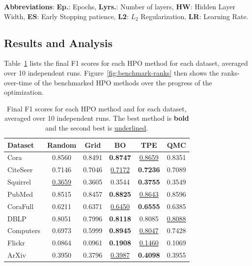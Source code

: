 \begin{table}
	{\footnotesize  \textbf{Abbreviations}: \textbf{Ep.}: Epochs, \textbf{Lyrs.}: Number of layers, \textbf{HW}: Hidden Layer Width, \textbf{ES}: Early Stopping patience, \textbf{L2}: \( L_2 \) Regularization, \textbf{LR}: Learning Rate.}
\end{table}

\subsection{Results and Analysis}
Table~\ref{tab:benchmark-final-scores} lists the final F1 scores for each HPO method for each dataset, averaged over 10 independent runs. Figure~\ref{fig:benchmark-ranks} then shows the ranks-over-time of the benchmarked HPO methods over the progress of the optimization.

\begin{table}
	\caption{Final F1 scores for each HPO method and for each dataset, averaged over 10 independent runs. The best method is \textbf{bold} and the second best is \underline{underlined}.}
	\label{tab:benchmark-final-scores}
	\centering
	\begin{tabular}{lccccc}
		\toprule
		\textbf{Dataset} & \textbf{Random}    & \textbf{Grid} & \textbf{BO}        & \textbf{TPE}       & \textbf{QMC}       \\
		\midrule
		Cora             & 0.8560             & 0.8491        & \textbf{0.8747}    & \underline{0.8659} & 0.8351             \\
		CiteSeer         & 0.7146             & 0.7046        & \underline{0.7172} & \textbf{0.7236}    & 0.7089             \\
		Squirrel         & \underline{0.3659} & 0.3605        & 0.3544             & \textbf{0.3755}    & 0.3549             \\
		PubMed           & 0.8515             & 0.8457        & \textbf{0.8825}    & \underline{0.8643} & 0.8596             \\
		CoraFull         & 0.6211             & 0.6371        & \underline{0.6450} & \textbf{0.6555}    & 0.6385             \\
		DBLP             & 0.8051             & 0.7996        & \textbf{0.8118}    & 0.8085             & \underline{0.8088} \\
		Computers        & 0.6973             & 0.5999        & \textbf{0.8945}    & \underline{0.8047} & 0.7428             \\
		Flickr           & 0.0864             & 0.0961        & \textbf{0.1908}    & \underline{0.1460} & 0.1069             \\
		ArXiv            & 0.3950             & 0.3796        & \underline{0.3987} & \textbf{0.4098}    & 0.3955             \\
		\bottomrule
	\end{tabular}
\end{table}

